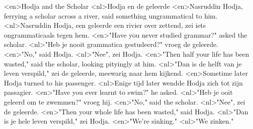 <en>Hodja and the Scholar
<nl>Hodja en de geleerde
<en>Nasruddin Hodja, ferrying a scholar across a river, said something ungrammatical to him.
<nl>Nasruddin Hodja, een geleerde een rivier over zettend,  zei iets ongrammaticaals tegen hem.
<en>"Have you never studied grammar?" asked the scholar.
<nl>"Heb je nooit grammatica gestudeerd?" vroeg de geleerde.
<en>"No," said Hodja.
<nl>"Nee", zei Hodja.
<en>"Then half your life has been wasted," said the scholar, looking pityingly at him.
<nl>"Dan is de helft van je leven verspild," zei de geleerde, meewarig naar hem kijkend.
<en>Sometime later Hodja turned to his passenger.
<nl>Enige tijd later wendde Hodja zich tot zijn passagier.
<en>"Have you ever learnt to swim?" he asked.
<nl>"Heb je ooit geleerd om te zwemmen?" vroeg hij.
<en>"No," said the scholar.
<nl>"Nee", zei de geleerde.
<en>"Then your whole life has been wasted," said Hodja.
<nl>"Dan is je hele leven verspild," zei Hodja.
<en>"We're sinking."
<nl>"We zinken."
